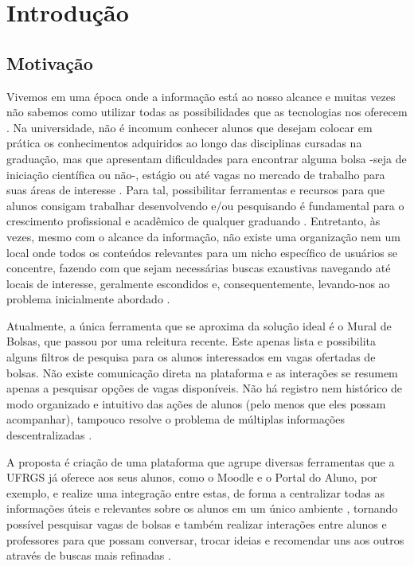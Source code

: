 \chapter{Introdução}

\section{Motivação}
\label{introducaoMotivacao}

Vivemos em uma época onde a informação está ao nosso alcance e muitas vezes não sabemos como utilizar todas as possibilidades que as tecnologias nos oferecem \cite{anotherNodeArticle} \cite{impactInternetArticle}. Na universidade, não é incomum conhecer alunos que desejam colocar em prática os conhecimentos adquiridos ao longo das disciplinas cursadas na graduação, mas que apresentam dificuldades para encontrar alguma bolsa -seja de iniciação científica ou não-,
estágio ou até vagas no mercado de trabalho para suas áreas de interesse \cite{internetLibDesArticle}. Para tal, possibilitar ferramentas e recursos para que alunos consigam trabalhar desenvolvendo e/ou pesquisando é fundamental para o crescimento profissional e acadêmico de qualquer graduando \cite{teachMediaArticle}. Entretanto, às vezes, mesmo com o alcance da informação, não existe uma organização nem um local onde todos os conteúdos relevantes para um nicho específico de usuários se concentre, fazendo com que sejam necessárias buscas exaustivas navegando até locais de interesse, geralmente escondidos e, consequentemente, levando-nos ao problema inicialmente abordado \cite{socConnectArticle}.

Atualmente, a única ferramenta que se aproxima da solução ideal é o Mural de Bolsas, que passou por uma releitura recente. Este apenas lista e possibilita alguns filtros de pesquisa para os alunos interessados em vagas ofertadas de bolsas. Não existe comunicação direta na plataforma e as interações se resumem apenas a pesquisar opções de vagas disponíveis. Não há registro nem histórico de modo organizado e intuitivo das ações de alunos (pelo menos que eles possam acompanhar), tampouco resolve o problema de múltiplas informações descentralizadas \cite{socialChallengeArticle}.

A proposta é criação de uma plataforma que agrupe diversas ferramentas que a UFRGS já oferece aos seus alunos, como o Moodle e o Portal do Aluno, por exemplo, e realize uma integração entre estas, de forma a centralizar todas as informações úteis e relevantes sobre os alunos em um único ambiente \cite{socConnectArticle}, tornando possível pesquisar vagas de bolsas e também realizar interações entre alunos e professores para que possam conversar, trocar ideias e recomendar uns aos outros através de buscas mais refinadas \cite{UXLinkedinArticle} \cite{agileCareerArticle}. 

